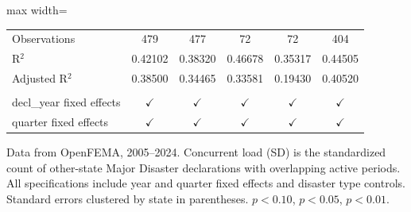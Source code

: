 \begin{table}[htbp]
\begin{adjustbox}{max width=\textwidth}
\begin{tabular}{lccccc}
       \\
      Observations              & 479             & 477             & 72             & 72              & 404\\  
      R$^2$                     & 0.42102         & 0.38320         & 0.46678        & 0.35317         & 0.44505\\  
      Adjusted R$^2$            & 0.38500         & 0.34465         & 0.33581        & 0.19430         & 0.40520\\  
       \\
      decl\_year fixed effects  & $\checkmark$    & $\checkmark$    & $\checkmark$   & $\checkmark$    & $\checkmark$\\   
      quarter fixed effects     & $\checkmark$    & $\checkmark$    & $\checkmark$   & $\checkmark$    & $\checkmark$\\   
      \bottomrule
   \end{tabular}
   \end{adjustbox}

   \par \raggedright 
   Data from OpenFEMA, 2005--2024. Concurrent load (SD) is the standardized count of other-state Major Disaster declarations with overlapping active periods. All specifications include year and quarter fixed effects and disaster type controls. Standard errors clustered by state in parentheses. \sym{*} $p<0.10$, \sym{**} $p<0.05$, \sym{***} $p<0.01$.
\end{table}


